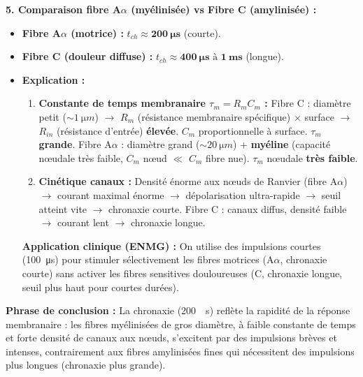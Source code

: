 \documentclass[11pt]{article}
\begin{document}
\begin{exoresolu}
\textbf{5. Comparaison fibre A$\alpha$ (myélinisée) vs Fibre C (amylinisée) :}
\begin{itemize}
    \item \textbf{Fibre A$\alpha$ (motrice) :} $t_{ch} \approx \mathbf{200\ \mu s}$ (courte).
    \item \textbf{Fibre C (douleur diffuse) :} $t_{ch} \approx \mathbf{400\ \mu s \text{ à } 1\ ms}$ (longue).
    \item \textbf{Explication :}
    \begin{enumerate}
        \item \textbf{Constante de temps membranaire $\tau_m = R_m C_m$ :} Fibre C : diamètre petit ($\sim \SI{1}{\micro m}$) $\rightarrow$ $R_m$ (résistance membranaire spécifique) $\times$ surface $\rightarrow$ $R_{in}$ (résistance d'entrée) \textbf{élevée}. $C_m$ proportionnelle à surface. $\tau_m$ \textbf{grande}. Fibre A$\alpha$ : diamètre grand ($\sim \SI{20}{\micro m}$) + \textbf{myéline} (capacité nœudale très faible, $C_m$ nœud $\ll$ $C_m$ fibre nue). $\tau_m$ nœudale \textbf{très faible}.
        \item \textbf{Cinétique canaux  :} Densité énorme aux nœuds de Ranvier (fibre A$\alpha$) $\rightarrow$ courant  maximal énorme $\rightarrow$ dépolarisation ultra-rapide $\rightarrow$ seuil atteint vite $\rightarrow$ chronaxie courte. Fibre C : canaux  diffus, densité faible $\rightarrow$ courant  lent $\rightarrow$ chronaxie longue.
    \end{enumerate}
    \textbf{Application clinique (ENMG) :} On utilise des impulsions courtes (\SI{100}{\micro s}) pour stimuler sélectivement les fibres motrices (A$\alpha$, chronaxie courte) sans activer les fibres sensitives douloureuses (C, chronaxie longue, seuil plus haut pour courtes durées).
\end{itemize}

\textbf{Phrase de conclusion :} La chronaxie (\SI{200}{\mu s}) reflète la rapidité de la réponse membranaire : les fibres myélinisées de gros diamètre, à faible constante de temps et forte densité de canaux  aux nœuds, s'excitent par des impulsions brèves et intenses, contrairement aux fibres amylinisées fines qui nécessitent des impulsions plus longues (chronaxie plus grande).
\end{exoresolu}
\end{document}
